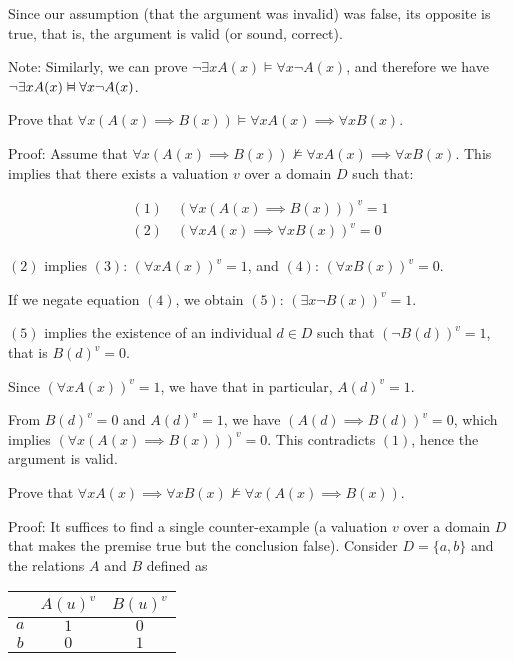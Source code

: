 \documentclass{article}
\newcommand{\vDashv}{%
  \mathrel{%
    \text{%
      \ooalign{$\vDash$\cr\reflectbox{$\vDash$}\cr}%
    }%
  }%
}
\begin{document}
Since our assumption (that the argument was invalid) was false, its opposite is true, that is, the argument is valid (or sound, correct). 

Note: Similarly, we can prove $\neg \exists x A(x) \vDash \forall x \neg A(x)$, and therefore we have $\neg \exists x A(x) \vDashv \forall x \neg A(x)$.

Prove that $\forall x (A(x) \implies B(x)) \vDash \forall x A(x) \implies \forall x B(x)$.

Proof: Assume that $\forall x (A(x) \implies B(x)) \not\vDash \forall x A(x) \implies \forall x B(x)$. This implies that there exists a valuation $v$ over a domain $D$ such that:

\begin{align*}
(1) \quad (\forall x (A(x) \implies B(x)))^v = 1 \\
(2) \quad (\forall x A(x) \implies \forall x B(x))^v = 0
\end{align*}

$(2)$ implies $(3)$: $(\forall x A(x))^v = 1$, and $(4)$: $(\forall x B(x))^v = 0$.

If we negate equation $(4)$, we obtain $(5)$: $(\exists x \neg B(x))^v = 1$.

$(5)$ implies the existence of an individual $d \in D$ such that $(\neg B(d))^v = 1$, that is $B(d)^v = 0$. 

Since $(\forall x A(x))^v = 1$, we have that in particular, $A(d)^v = 1$. 

From $B(d)^v = 0$ and $A(d)^v = 1$, we have $(A(d) \implies B(d))^v = 0$, which implies $(\forall x (A(x) \implies B(x)))^v = 0$. This contradicts $(1)$, hence the argument is valid.

Prove that $\forall x A(x) \implies \forall x B(x) \not\vDash \forall x (A(x) \implies B(x))$.

Proof: It suffices to find a single counter-example (a valuation $v$ over a domain $D$ that makes the premise true but the conclusion false). Consider $D = \{a,b\}$ and the relations $A$ and $B$ defined as


\begin{table}[h]
    \centering
    \begin{tabular}{c|cc}
         &  $A(u)^v$& $B(u)^v$\\ \hline
         $a$&  $1$& $0$\\
         $b$&  $0$& $1$\\
    \end{tabular}
\end{table}
\end{document}
